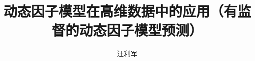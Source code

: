 \documentclass[fangfont=STFANGSO.TTF,heifont=YaHeiConsolas.ttf]{zju-proposal}
\title{动态因子模型在高维数据中的应用（有监督的动态因子模型预测）}{浙江大学本科生毕业论文（设计）}
\author{汪利军}{3140105707}
\begin{document}
	\makecover
	\begin{refsection}
	
	\thispagestyle{guidepage}
	\end{refsection}
	\tableofcontents
	
	\begin{refsection}	
	
	\end{refsection}
	
	\begin{refsection}
	
	\end{refsection}
	\begin{refsection}
	
	\end{refsection}
	
	


%	
	
\end{document}
